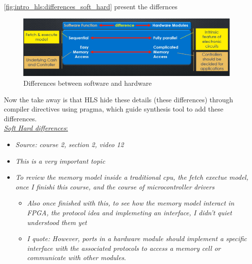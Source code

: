 \autoref{fig:intro_hls:differences_soft_hard} present the differnces

\begin{figure}[h]
\centering
\includegraphics[scale=0.35,frame]{Figures/intro_hls/differences_soft_hard}
\caption{Differences between software and hardware}
\label{fig:intro_hls:differences_soft_hard}
\end{figure}

Now the take away is that HLS hide these details (these differences) through compiler directives using pragma, which guide synthesis tool to add these differences.\\

\newpage
\underline{\textit{Soft Hard differences}:} 

\begin{itemize}

\item \textit{Source: course 2, section 2,  video 12}

\item \textit{This is a very important topic}

\item \textit{To review the memory model inside a traditional cpu, the fetch exectue model, once I finishi this course, and the course of microcontroller drivers}

	\begin{itemize}
	\item \textit{Also once finished with this, to see how the 		memory model interact in FPGA, the protocol idea and 				implemeting an interface, I didn't quiet understood them yet}

	\item \textit{I quote: However, ports in a hardware module should implement a specific interface with the associated protocols to access a memory cell or communicate with other modules}.
	
	\end{itemize}
	
\end{itemize}

\newpage

